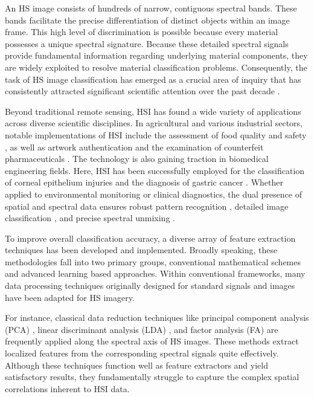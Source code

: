 \documentclass[12pt,onecolumn]{article}
\begin{document}
An HS image consists of hundreds of narrow, contiguous spectral bands. These bands facilitate the precise differentiation of distinct objects within an image frame. This high level of discrimination is possible because every material possesses a unique spectral signature. Because these detailed spectral signals provide fundamental information regarding underlying material components, they are widely exploited to resolve material classification problems. Consequently, the task of HS image classification has emerged as a crucial area of inquiry that has consistently attracted significant scientific attention over the past decade \cite{hs_apps_review}.

Beyond traditional remote sensing, HSI has found a wide variety of applications across diverse scientific disciplines. In agricultural and various industrial sectors, notable implementations of HSI include the assessment of food quality and safety \cite{hs_food}, as well as artwork authentication \cite{artwork} and the examination of counterfeit pharmaceuticals \cite{drug}. The technology is also gaining traction in biomedical engineering fields. Here, HSI has been successfully employed for the classification of corneal epithelium injuries \cite{corneal} and the diagnosis of gastric cancer \cite{gastric}. Whether applied to environmental monitoring or clinical diagnostics, the dual presence of spatial and spectral data ensures robust pattern recognition \cite{pattern}, detailed image classification \cite{hs_class}, and precise spectral unmixing \cite{unmixing}.

To improve overall classification accuracy, a diverse array of feature extraction techniques has been developed and implemented. Broadly speaking, these methodologies fall into two primary groups, conventional mathematical schemes and advanced learning based approaches. Within conventional frameworks, many data processing techniques originally designed for standard signals and images have been adapted for HS imagery.

For instance, classical data reduction techniques like principal component analysis (PCA) \cite{pca}, linear discriminant analysis (LDA) \cite{lda}, and factor analysis (FA) \cite{factor} are frequently applied along the spectral axis of HS images. These methods extract localized features from the corresponding spectral signals quite effectively. Although these techniques function well as feature extractors and yield satisfactory results, they fundamentally struggle to capture the complex spatial correlations inherent to HSI data.
\end{document}
